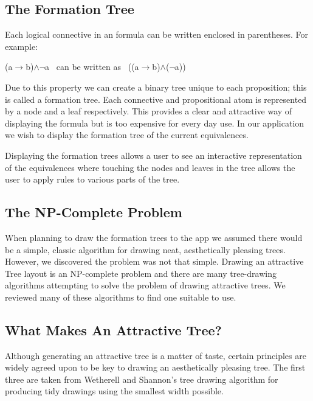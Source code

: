 \documentclass{report}
\begin{document}
\subsection{The Formation Tree}

Each logical connective in an formula can be written enclosed in parentheses. For example:

\begin{center}
(a$\to$b)$\land$$\neg$a \ can be written as \ ((a$\to$b)$\land$($\neg$a))
\end{center}

Due to this property we can create a binary tree unique to each proposition; this is called a formation tree. Each connective and propositional atom is represented by a node and a leaf respectively. This provides a clear and attractive way of displaying the formula but is too expensive for every day use. In our application we wish to display the formation tree of the current equivalences.

Displaying the formation trees allows a user to see an interactive representation of the equivalences where touching the nodes and leaves in the tree allows the user to apply rules to various parts of the tree.

\subsection{The NP-Complete Problem}

When planning to draw the formation trees to the app we assumed there would be a simple, classic algorithm for drawing neat, aesthetically pleasing trees. However, we discovered the problem was not that simple. Drawing an attractive Tree layout is an NP-complete problem\cite{npcompletetrees} and there are many tree-drawing algorithms attempting to solve the problem of drawing attractive trees. We reviewed many of these algorithms to find one suitable to use.

\subsection{What Makes An Attractive Tree?}

Although generating an attractive tree is a matter of taste, certain principles are widely agreed upon to be key to drawing an aesthetically pleasing tree. The first three are taken from Wetherell and Shannon's tree drawing algorithm for producing tidy drawings using the smallest width possible\cite{tidierdrawingsws}.
\end{document}
